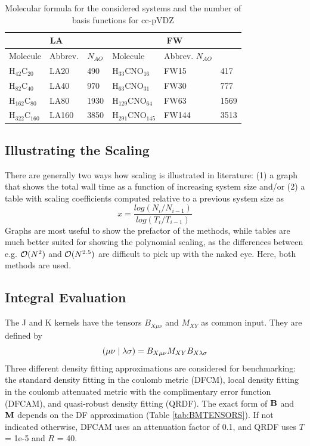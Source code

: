 \begin{table}
\centering
\begin{tabular}{llllll}
\hline
\multicolumn{3}{c}{LA} & \multicolumn{3}{c}{FW} \\ \hline
Molecule & Abbrev. & $N_{AO}$ & Molecule & Abbrev. $N_{AO}$ \\ \hline
H$_{42}$C$_{20}$ & LA20 & 490 & H$_{33}$CNO$_{16}$ & FW15 & 417 \\
H$_{82}$C$_{40}$ & LA40 & 970 & H$_{63}$CNO$_{31}$ & FW30 & 777 \\
H$_{162}$C$_{80}$ & LA80 & 1930 & H$_{129}$CNO$_{64}$ & FW63 & 1569  \\
H$_{322}$C$_{160}$ & LA160 & 3850 & H$_{291}$CNO$_{145}$ & FW144 & 3513 \\
\hline  
\end{tabular}
\label{fig:GS_NBAS}
\caption{Molecular formula for the considered systems and the number of basis functions for cc-pVDZ}
\end{table}

\subsection{Illustrating the Scaling}

There are generally two ways how scaling is illustrated in literature: (1) a graph that shows the total wall time as a function of increasing system size and/or (2) a table with scaling coefficients computed relative to a previous system size as
\begin{equation}
x = \frac{log(N_i/N_{i-1})}{log(T_i/T_{i-1})}
\end{equation} 
\noindent Graphs are most useful to show the prefactor of the methods, while tables are much better suited for showing the polynomial scaling, as the differences between e.g. $\mathcal{O}(N^{2})$ and $\mathcal{O}(N^{2.5})$ are difficult to pick up with the naked eye. Here, both methods are used. 

\FloatBarrier

\subsection{Integral Evaluation}

The J and K kernels have the tensors $B_{X\mu\nu}$ and $M_{XY}$ as common input. They are defined by
\begin{equation}
\left( \mu\nu \mid \lambda\sigma \right) = B_{X\mu\nu} M_{XY} B_{X\lambda\sigma}
\end{equation}
\noindent Three different density fitting approximations are considered for benchmarking: the standard density fitting in the coulomb metric (DFCM), local density fitting in the coulomb attenuated metric with the complimentary error function (DFCAM), and quasi-robust density fitting (QRDF). The exact form of $\mathbf{B}$ and $\mathbf{M}$ depends on the DF approximation (Table \ref{tab:BMTENSORS}). If not indicated otherwise, DFCAM uses an attenuation factor of 0.1, and QRDF uses $T$ = 1e-5 and $R$ = 40. 


